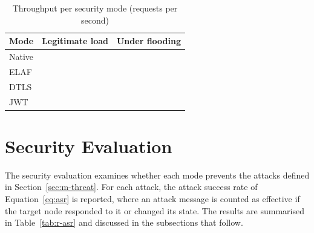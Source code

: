 \begin{table}[htbp]
  \centering
  \caption{Throughput per security mode (requests per second)}
  \label{tab:r-tp}
  \renewcommand{\arraystretch}{1.2}
  \begin{tabularx}{\textwidth}{@{}X c c@{}}
    \toprule
    \textbf{Mode} & \textbf{Legitimate load} & \textbf{Under flooding} \\
    \midrule
    Native        & \tbd{}                   & \tbd{}                  \\
    ELAF          & \tbd{}                   & \tbd{}                  \\
    DTLS          & \tbd{}                   & \tbd{}                  \\
    JWT           & \tbd{}                   & \tbd{}                  \\
    \bottomrule
  \end{tabularx}
\end{table}

\section{Security Evaluation}
\label{sec:r-sec}

The security evaluation examines whether each mode prevents the attacks defined in Section~\ref{sec:m-threat}. For each attack, the attack success rate of Equation~\ref{eq:asr} is reported, where an attack message is counted as effective if the target node responded to it or changed its state. The results are summarised in Table~\ref{tab:r-asr} and discussed in the subsections that follow.

